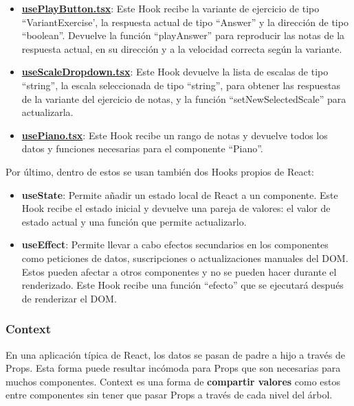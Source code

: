\documentclass[12pt,twoside,titlepage]{report}
\begin{document}
\begin{itemize}
    \item \href{https://github.com/alberttogoca/EarFit/blob/main/src/hooks/usePlayButton.tsx}{\textbf{usePlayButton.tsx}}: Este Hook recibe la variante de ejercicio de tipo ``VariantExercise', la respuesta actual de tipo ``Answer'' y la dirección de tipo ``boolean''. Devuelve la función ``playAnswer'' para reproducir las notas de la respuesta actual, en su dirección y a la velocidad correcta según la variante.
    \item \href{https://github.com/alberttogoca/EarFit/blob/main/src/hooks/useScaleDropdown.tsx}{\textbf{useScaleDropdown.tsx}}: Este Hook devuelve la lista de escalas de tipo ``string\text{[]}'', la escala seleccionada de tipo ``string'', para obtener las respuestas de la variante del ejercicio de notas, y la función ``setNewSelectedScale'' para actualizarla.
    \item \href{https://github.com/alberttogoca/EarFit/blob/main/src/hooks/usePiano.tsx}{\textbf{usePiano.tsx}}: Este Hook recibe un rango de notas y devuelve todos los datos y funciones necesarias para el componente ``Piano''.
\end{itemize}

Por último, dentro de estos se usan también dos Hooks propios de React:
\begin{itemize}
 \item \textbf{useState}: Permite añadir un estado local de React a un componente. Este Hook recibe el estado inicial y devuelve una pareja de valores: el valor de estado actual y una función que permite actualizarlo. \cite{useState}
 \item \textbf{useEffect}: Permite llevar a cabo efectos secundarios en los componentes como peticiones de datos, suscripciones o actualizaciones manuales del DOM. Estos pueden afectar a otros componentes y no se pueden hacer durante el renderizado. Este Hook recibe una función ``efecto'' que se ejecutará después de renderizar el DOM. \cite{useEffect} 
\end{itemize}

\subsubsection{Context}

En una aplicación típica de React, los datos se pasan de padre a hijo a través de Props. Esta forma puede resultar incómoda para Props que son necesarias para muchos componentes. Context es una forma de \textbf{compartir valores} como estos entre componentes sin tener que pasar Props a través de cada nivel del árbol.
\cite{context1}
\end{document}
